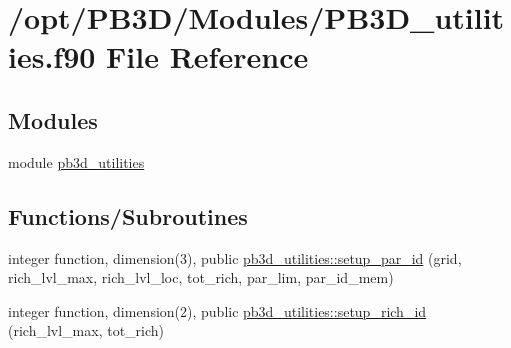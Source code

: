 \hypertarget{PB3D__utilities_8f90}{}\section{/opt/\+P\+B3\+D/\+Modules/\+P\+B3\+D\+\_\+utilities.f90 File Reference}
\label{PB3D__utilities_8f90}
\subsection*{Modules}
\begin{DoxyCompactItemize}
\item 
module \hyperlink{namespacepb3d__utilities}{pb3d\+\_\+utilities}
\end{DoxyCompactItemize}
\subsection*{Functions/\+Subroutines}
\begin{DoxyCompactItemize}
\item 
integer function, dimension(3), public \hyperlink{namespacepb3d__utilities_ad047cd7b197aae821e2565933faccfa3}{pb3d\+\_\+utilities\+::setup\+\_\+par\+\_\+id} (grid, rich\+\_\+lvl\+\_\+max, rich\+\_\+lvl\+\_\+loc, tot\+\_\+rich, par\+\_\+lim, par\+\_\+id\+\_\+mem)
\item 
integer function, dimension(2), public \hyperlink{namespacepb3d__utilities_ab461e756a85b3c6e8fa1ccaa6556c5b0}{pb3d\+\_\+utilities\+::setup\+\_\+rich\+\_\+id} (rich\+\_\+lvl\+\_\+max, tot\+\_\+rich)
\end{DoxyCompactItemize}
